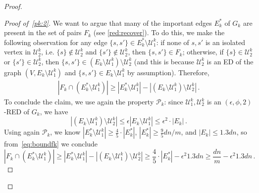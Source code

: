 \documentclass[epsfig,letter,11pt]{article}
\numberwithin{equation}{section}
\begin{document}
\begin{proof}
\begin{proof}[Proof of~\eqref{pk:2}]
		We want to argue that many of the important edges $E^*_k$ of $G_k$ are present in the set of pairs $F_k$ (see \cref{red:recover}). To do this, we make the following observation for any edge $\{s,s'\} \in E^*_k \setminus \mathcal{U}^k_1 $: if none of $s,s'$ is an isolated vertex in $\mathcal{U}_2^k$, i.e. $\{s\} \notin \mathcal{U}_2^k$ and $\{s'\} \notin \mathcal{U}_2^k$, then $\{s,s'\} \in F_k$; otherwise, if $\{s\} \in \mathcal{U}_2^k$ or $\{s'\} \in \mathcal{U}_2^k$, then $\{s,s'\} \in(E_k \setminus \mathcal{U}_1^k) \setminus \mathcal{U}_2^k$ (and this is because  $\mathcal{U}_2^k$ is an ED of the graph $(V,E_k \setminus \mathcal{U}_1^k)$ and $\{s,s'\} \in E_k \setminus \mathcal{U}_1^k$ by assumption). Therefore,
		\begin{align}
			\label{eq:boundfk}
			|F_k \cap (E^*_k \setminus \mathcal{U}^k_1)| \ge |E^*_k \setminus \mathcal{U}^k_1| - |(E_k \setminus \mathcal{U}_1^k) \setminus \mathcal{U}_2^k| \, .
		\end{align}
		To conclude the claim, we use again the property $\mathcal{P}_k$: since $\mathcal{U}_1^k,\mathcal{U}_2^k$ is an $(\epsilon,\phi,2)$-RED of  $G_k$, we have
		\begin{equation*}
			\left|(E_k \setminus \mathcal{U}_1^k) \setminus \mathcal{U}_2^k \right| \le \epsilon |E_k \setminus \mathcal{U}_1^k| \le \epsilon^2 \cdot |E_k| \, .
		\end{equation*}
		Using again $\mathcal{P}_k$, we know $| E^*_k \setminus \mathcal{U}^k_1| \ge \frac{4}{5} \cdot |E^*_k|$,  $|E_k^*| \ge \frac{9}{5}{dn}/{m}$,  and $|E_k| \le  1.3 dn$, so from~\eqref{eq:boundfk} we conclude
		\begin{equation}
			|F_k \cap (E^*_k \setminus \mathcal{U}^k_1)| \ge |E^*_k \setminus \mathcal{U}^k_1| - |(E_k \setminus \mathcal{U}_1^k) \setminus \mathcal{U}_2^k| \ge  \frac{4}{5} \cdot |E^*_k|- \epsilon^2 1.3 dn \ge \frac{dn}{m}- \epsilon^2 1.3 dn\, .
		\end{equation}
	\end{proof}
	

\end{proof}
\end{document}
